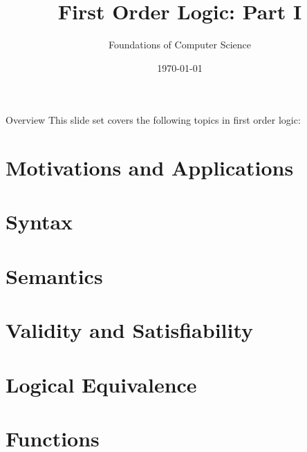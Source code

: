 \documentclass[style=sailor,size=12pt]{powerdot}
\title{First Order Logic: Part I}
\author{Foundations of Computer Science}
\date{\today}
\begin{document}
\maketitle
\begin{slide}[toc=,bm=]{Overview}
This slide set covers the following topics in first order logic:

\vspace{5mm}
\tableofcontents[content=sections]
\end{slide}

\section[slide=true]{Motivations and Applications}


\section[slide=true]{Syntax}


\section[slide=true]{Semantics}


\section[slide=true]{Validity and Satisfiability}


\section[slide=true]{Logical Equivalence}


\section[slide=true]{Functions}

\end{document}
